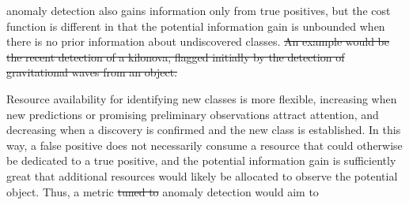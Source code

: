  anomaly detection also gains information only from true positives, but the cost function is different in that the potential information gain is unbounded when there is no prior information about undiscovered classes.
\sout{An example would be the recent detection of a kilonova, flagged initially by the detection of gravitational waves from an object.}

Resource availability for identifying new classes is more flexible, increasing when new predictions or promising preliminary observations attract attention, and decreasing when a discovery is confirmed and the new class is established.
In this way, a false positive does not necessarily consume a resource that could otherwise be dedicated to a true positive, and the potential information gain is sufficiently great that additional resources would likely be allocated to observe the potential object.
Thus, a metric \sout{tuned to}  anomaly detection would aim to 

%

